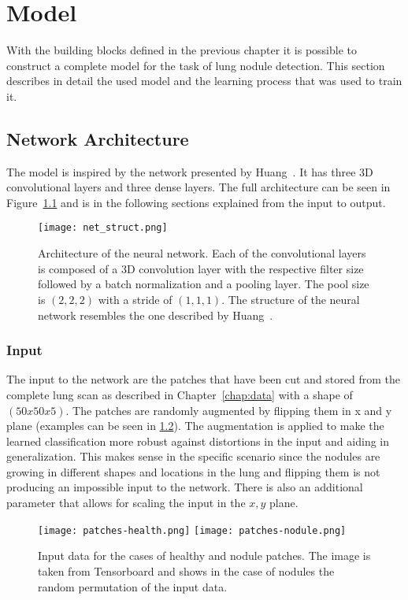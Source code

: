 \documentclass[main.tex]{subfiles}
\begin{document}
\chapter{Model}\label{chap:model}
With the building blocks defined in the previous chapter it is possible to construct a complete model for the task of lung nodule detection. This section describes in detail the used model and the learning process that was used to train it.

\section{Network Architecture}
The model is inspired by the network presented by Huang~\cite{huang2017lung}. It has three 3D convolutional layers and three dense layers. The full architecture can be seen in Figure~\ref{fig:net_struct} and is in the following sections explained from the input to output.

\begin{figure}
\begin{center}
\texttt{[image: net\_struct.png]}
\end{center}
\caption{Architecture of the neural network. Each of the convolutional layers is composed of a 3D convolution layer with the respective filter size followed by a batch normalization and a pooling layer. The pool size is $(2,2,2)$ with a stride of $(1,1,1)$. The structure of the neural network resembles the one described by Huang~\cite{huang2017lung}.}
\label{fig:net_struct}
\end{figure}

\subsection{Input} 
The input to the network are the patches that have been cut and stored from the complete lung scan as described in Chapter~\ref{chap:data} with a shape of $(50x50x5)$. The patches are randomly augmented by flipping them in x and y plane (examples can be seen in \ref{fig:input}). The augmentation is applied to make the learned classification more robust against distortions in the input and aiding in generalization. This makes sense in the specific scenario since the nodules are growing in different shapes and locations in the lung and flipping them is not producing an impossible input to the network. There is also an additional parameter that allows for scaling the input in the $x,y$ plane.

\begin{figure}
\begin{center}
\texttt{[image: patches-health.png]}
\texttt{[image: patches-nodule.png]}
\end{center}
\caption{Input data for the cases of healthy and nodule patches. The image is taken from Tensorboard and shows in the case of nodules the random permutation of the input data.}
\label{fig:input}
\end{figure}
\end{document}
